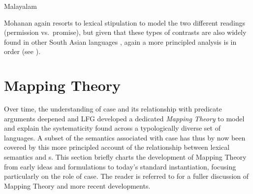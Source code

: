 \documentclass[output=paper,hidelinks]{langscibook}
\begin{document}
\begin{exe}
  \ex \label{ex:mal-modal} Malayalam
  \begin{xlist}
  \end{xlist}
  \end{exe}
  Mohanan again resorts to lexical stipulation to model the two different
  readings (permission vs.~promise), but given that these types of contrasts are
  also widely found in other South Asian languages
  \citep{buttahmed11,bhattetal11}, again a more principled analysis is in order  (see ).





\section{Mapping Theory}
\label{sec:linking}

Over time, the understanding of case and its relationship with predicate arguments
deepened and LFG developed a dedicated \textit{Mapping Theory} to model and explain the
systematicity found across a typologically diverse set of languages.  
A subset of the semantics associated with case has thus by now  been covered by this
 more principled account of the relationship between lexical semantics and
 {\GF}s.  This section briefly charts the development of Mapping Theory from 
 early ideas and formulations to today's standard instantiation, focusing particularly on
the role of case.  The reader is referred to  for a fuller discussion of Mapping Theory and more recent developments. 
\end{document}
